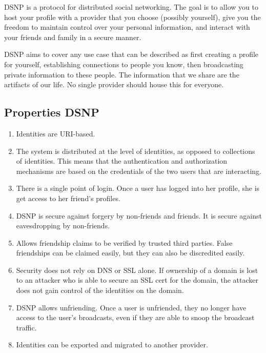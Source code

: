 \documentclass[letterpaper,11pt,oneside]{article}
\begin{document}
DSNP is a protocol for distributed social networking. The goal is to allow you
to host your profile with a provider that you choose (possibly yourself), give
you the freedom to maintain control over your personal information, and
interact with your friends and family in a secure manner.

DSNP aims to cover any use case that can be described as first creating a
profile for yourself, establishing connections to people you know, then
broadcasting private information to these people. The information that we share
are the artifacts of our life. No single provider should house this for
everyone.

\subsection{Properties DSNP}

\begin{enumerate}

\item Identities are URI-based.

\item The system is distributed at the level of identities, as opposed to collections
of identities. This means that the authentication and authorization mechanisms
are based on the credentials of the two users that are interacting.

\item There is a single point of login. Once a user has logged into her profile, she is get access to her friend's profiles.

\item DSNP is secure against forgery by non-friends and friends. It is secure against
eavesdropping by non-friends.

\item Allows friendship claims to be verified by trusted third parties. False
friendships can be claimed easily, but they can also be discredited easily.

\item Security does not rely on DNS or SSL alone. If ownership of a domain is lost to
an attacker who is able to secure an SSL cert for the domain, the attacker does
not gain control of the identities on the domain.

\item DSNP allows unfriending. Once a user is unfriended, they no longer have access
to the user's broadcasts, even if they are able to snoop the broadcast traffic.

\item Identities can be exported and migrated to another provider.

\end{enumerate}
\end{document}
